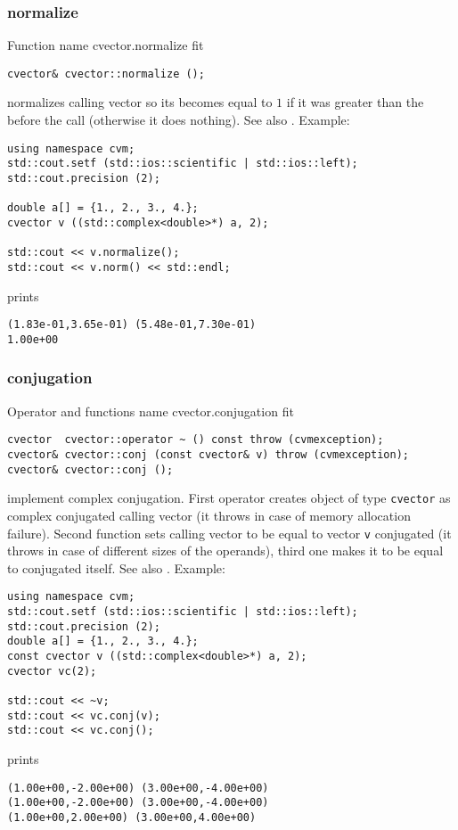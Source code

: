 \subsubsection{normalize}
Function%
\pdfdest name {cvector.normalize} fit
\begin{verbatim}
cvector& cvector::normalize ();
\end{verbatim}
normalizes  calling vector so its 
becomes equal to $1$ if it was greater than the
before the call (otherwise it does nothing).
See also .
Example:
\begin{Verbatim}
using namespace cvm;
std::cout.setf (std::ios::scientific | std::ios::left);
std::cout.precision (2);

double a[] = {1., 2., 3., 4.};
cvector v ((std::complex<double>*) a, 2);

std::cout << v.normalize();
std::cout << v.norm() << std::endl;
\end{Verbatim}
prints
\begin{Verbatim}
(1.83e-01,3.65e-01) (5.48e-01,7.30e-01)
1.00e+00
\end{Verbatim}
\newpage



\subsubsection{conjugation}
Operator and functions%
\pdfdest name {cvector.conjugation} fit
\begin{verbatim}
cvector  cvector::operator ~ () const throw (cvmexception);
cvector& cvector::conj (const cvector& v) throw (cvmexception);
cvector& cvector::conj ();
\end{verbatim}
implement complex conjugation.
First operator creates  object of type \verb"cvector" as
 complex conjugated calling vector
(it throws 
in case of memory allocation failure).
Second function sets calling vector to be equal to vector
\verb"v" conjugated
(it throws 
in case of different sizes of the operands),
third one makes it to be equal to
conjugated itself.
See also .
Example:
\begin{Verbatim}
using namespace cvm;
std::cout.setf (std::ios::scientific | std::ios::left);
std::cout.precision (2);
double a[] = {1., 2., 3., 4.};
const cvector v ((std::complex<double>*) a, 2);
cvector vc(2);

std::cout << ~v;
std::cout << vc.conj(v);
std::cout << vc.conj();
\end{Verbatim}
prints
\begin{Verbatim}
(1.00e+00,-2.00e+00) (3.00e+00,-4.00e+00)
(1.00e+00,-2.00e+00) (3.00e+00,-4.00e+00)
(1.00e+00,2.00e+00) (3.00e+00,4.00e+00)
\end{Verbatim}
\newpage


